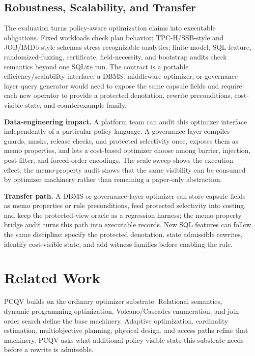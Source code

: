 \documentclass[conference]{IEEEtran}
\newcommand{\pcqv}{PCQV}
\begin{document}
\subsection{Robustness, Scalability, and Transfer}
\label{sec:robustness}
The evaluation turns policy-aware optimization claims into executable obligations. Fixed workloads check plan behavior; TPC-H/SSB-style and JOB/IMDb-style schemas stress recognizable analytics; finite-model, SQL-feature, randomized-fuzzing, certificate, field-necessity, and bootstrap audits check semantics beyond one SQLite run. The contract is a portable efficiency/scalability interface: a DBMS, middleware optimizer, or governance-layer query generator would need to expose the same capsule fields and require each new operator to provide a protected denotation, rewrite preconditions, cost-visible state, and counterexample family.

\textbf{Data-engineering impact.} A platform team can audit this optimizer interface independently of a particular policy language. A governance layer compiles guards, masks, release checks, and protected selectivity once, exposes them as memo properties, and lets a cost-based optimizer choose among barrier, injection, post-filter, and forced-order encodings. The scale sweep shows the execution effect; the memo-property audit shows that the same visibility can be consumed by optimizer machinery rather than remaining a paper-only abstraction.

\textbf{Transfer path.} A DBMS or governance-layer optimizer can store capsule fields as memo properties or rule preconditions, feed protected selectivity into costing, and keep the protected-view oracle as a regression harness; the memo-property bridge audit turns this path into \MemoCandidateRecords{} executable records. New SQL features can follow the same discipline: specify the protected denotation, state admissible rewrites, identify cost-visible state, and add witness families before enabling the rule.


\section{Related Work}
\label{sec:related}
\pcqv{} builds on the ordinary optimizer substrate. Relational semantics, dynamic-programming optimization, Volcano/Cascades enumeration, and join-order search define the base machinery\cite{codd1970relational,abiteboul1995foundations,selinger1979access,graefe1993volcano,graefe1995cascades,chaudhuri1998overview,graefe1993query,ioannidis1990randomized,swami1988largejoins,steinbrunn1997heuristic}. Adaptive optimization, cardinality estimation, multiobjective planning, physical design, and access paths refine that machinery\cite{kabra1998midquery,babcock2005robust,leis2015job,leis2017lookingglass,kipf2019learnedcards,hilprecht2020deepdb,dutt2019selectivity,trummer2016multiobjective,chaudhuri1997autoadmin,bruno2005autoadmin,bayer1972btree,comer1979btree}. \pcqv{} asks what additional policy-visible state this substrate needs before a rewrite is admissible.
\end{document}
